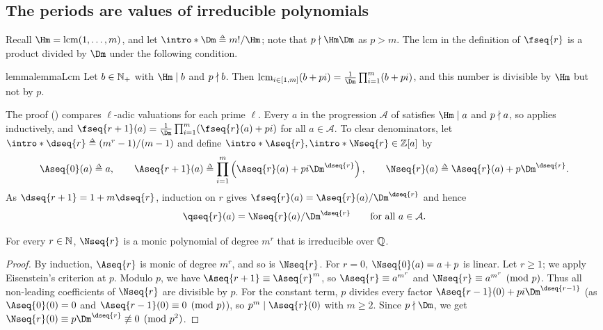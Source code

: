 \subsection{The periods are values of irreducible polynomials}\label{section: witness arithmetic}
\AP Recall $\Hm = \lcm(1, \dots, m)$, and let $\intro*\Dm \defeq m! / \Hm$; note that $p \ndiv \Hm \Dm$ as $p > m$.
The lcm in the definition of $\fseq{r}$ is a product divided by $\Dm$ under the following condition.
\begin{restatable}{lemma}{lemmaLcm}\label{lemma: lcm}
    Let $b \in \mathbb{N}_{+}$ with $\Hm \mid b$ and $p \nmid b$.
    Then $\lcm_{i \in \range{1, m}} (b + p i) = \frac{1}{\Dm} \prod_{i = 1}^{m} (b + p i)$, and this number is divisible by $\Hm$ but not by $p$.
\end{restatable}
The proof () compares $\ell$-adic valuations for each prime $\ell$.
Every $a$ in the progression $\mathcal{A}$ of  satisfies $\Hm \mid a$ and $p \nmid a$, so  applies inductively, and $\fseq{r+1}(a) = \frac{1}{\Dm} \prod_{i=1}^{m} (\fseq{r}(a) + p i)$ for all $a \in \mathcal{A}$.
\AP To clear denominators, let $\intro*\dseq{r} \defeq (m^r - 1) / (m - 1)$ and define $\intro*\Aseq{r}, \intro*\Nseq{r} \in \inte[a]$ by
\[\Aseq{0}(a) \defeq a, \qquad \Aseq{r+1}(a) \defeq \prod_{i = 1}^{m} \left(\Aseq{r}(a) + p i \Dm^{\dseq{r}}\right), \qquad \Nseq{r}(a) \defeq \Aseq{r}(a) + p \Dm^{\dseq{r}}.\]
As $\dseq{r+1} = 1 + m \dseq{r}$, induction on $r$ gives $\fseq{r}(a) = \Aseq{r}(a) / \Dm^{\dseq{r}}$ and hence
\begin{equation}
    \qseq{r}(a) = \Nseq{r}(a) / \Dm^{\dseq{r}} \qquad \text{for all } a \in \mathcal{A}. \label{equation: q N}
\end{equation}

\begin{lemma}\label{lemma: irreducible}
    For every $r \in \mathbb{N}$, $\Nseq{r}$ is a monic polynomial of degree $m^{r}$ that is irreducible over $\mathbb{Q}$.
\end{lemma}
\begin{proof}
    By induction, $\Aseq{r}$ is monic of degree $m^r$, and so is $\Nseq{r}$.
    For $r = 0$, $\Nseq{0}(a) = a + p$ is linear.
    Let $r \ge 1$; we apply Eisenstein's criterion at $p$.
    Modulo $p$, we have $\Aseq{r+1} \equiv \Aseq{r}^{m}$, so $\Aseq{r} \equiv a^{m^{r}}$ and $\Nseq{r} \equiv a^{m^{r}} \pmod p$.
    Thus all non-leading coefficients of $\Nseq{r}$ are divisible by $p$.
    For the constant term, $p$ divides every factor $\Aseq{r-1}(0) + p i \Dm^{\dseq{r-1}}$ (as $\Aseq{0}(0) = 0$ and $\Aseq{r-1}(0) \equiv 0 \pmod p$), so $p^{m} \mid \Aseq{r}(0)$ with $m \ge 2$.
    Since $p \ndiv \Dm$, we get $\Nseq{r}(0) \equiv p \Dm^{\dseq{r}} \not\equiv 0 \pmod{p^2}$.
\end{proof}

